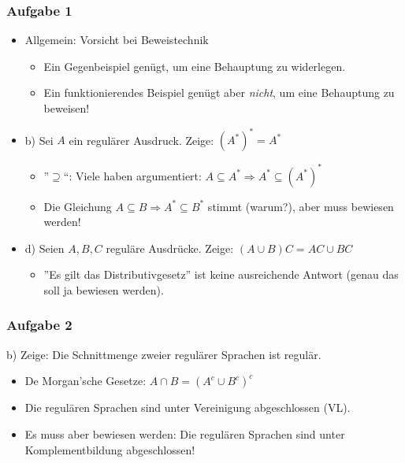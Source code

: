 


\begin{frame}
	\frametitle{Aufgabe 1}		
		\begin{itemize}
			\item Allgemein: Vorsicht bei Beweistechnik
			\begin{itemize}
				\item Ein Gegenbeispiel genügt, um eine Behauptung zu widerlegen.
				\item Ein funktionierendes Beispiel genügt aber \emph{nicht}, um eine Behauptung zu beweisen!
			\end{itemize}
			
			\pause			
			
			\item b) Sei $A$ ein regulärer Ausdruck. Zeige: $(A^*)^* = A^*$
			\begin{itemize}
				\item ''$\supseteq$``: Viele haben argumentiert: $ A \subseteq A^* \Rightarrow A^* \subseteq (A^*)^* $
				\item Die Gleichung $A \subseteq B \Rightarrow A^* \subseteq B^*$ stimmt (warum?), aber muss bewiesen werden!
			\end{itemize}
			
			\pause			
			
			\item d) Seien $A, B, C$ reguläre Ausdrücke. Zeige: $(A \cup B) C = AC \cup BC$ 
			\begin{itemize}
				\item ''Es gilt das Distributivgesetz'' ist keine ausreichende Antwort (genau das soll ja bewiesen werden).
			\end{itemize}
		\end{itemize}
	
\end{frame}
\begin{frame}
	
	\frametitle{Aufgabe 2}
		b) Zeige: Die Schnittmenge zweier regulärer Sprachen ist regulär.
		
		\begin{itemize}
			\item De Morgan'sche Gesetze: $A \cap B = (A^c \cup B^c)^c$ 
			\item Die regulären Sprachen sind unter Vereinigung abgeschlossen (VL).
			\item Es muss aber bewiesen werden: Die regulären Sprachen sind unter Komplementbildung abgeschlossen!
		\end{itemize}
\end{frame}

